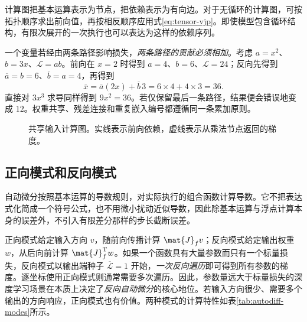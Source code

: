 \documentclass[../textbook.tex]{subfiles}
\begin{document}
计算图把基本运算表示为节点，把依赖表示为有向边。对于无循环的计算图，可按拓扑顺序求出前向值，再按相反顺序应用式\eqref{eq:tensor-vjp}。即使模型包含循环结构，有限次展开的一次执行也可以表达为这样的依赖序列。

一个变量若经由两条路径影响损失，\emph{两条路径的贡献必须相加}。考虑 $a=x^2$、$b=3x$、$\mathcal L=ab$。前向在 $x=2$ 时得到 $a=4$、$b=6$、$\mathcal L=24$；反向先得到 $\overline a=b=6$、$\overline b=a=4$，再得到
\begin{equation}
 \overline x=\overline a(2x)+\overline b\,3
 =6\times4+4\times3=36.
\end{equation}
直接对 $3x^3$ 求导同样得到 $9x^2=36$。若仅保留最后一条路径，结果便会错误地变成 $12$。权重共享、残差连接和重复嵌入编号都遵循同一条累加原则。

\begin{figure}[htbp]
\centering
{}
\caption[共享输入计算图]{共享输入计算图。实线表示前向依赖，虚线表示从乘法节点返回的梯度。}\label{fig:autodiff-shared-input}
\end{figure}

\subsection{正向模式和反向模式}
自动微分按照基本运算的导数规则，对实际执行的组合函数计算导数。它不把表达式化简成一个符号公式，也不用微小扰动近似导数，因此除基本运算与浮点计算本身的误差外，不引入有限差分那样的步长截断误差。

正向模式给定输入方向 $v$，随前向传播计算 $\mat{J}_fv$；反向模式给定输出权重 $w$，从后向前计算 $\mat{J}_f^{\mathrm{T}}w$。如果一个函数具有大量参数而只有一个标量损失，反向模式以输出端种子 $\overline{\mathcal L}=1$ 开始，\emph{一次反向遍历}即可得到所有参数的梯度。逐坐标使用正向模式则通常需要多次遍历。因此，参数量远大于标量损失的深度学习场景在本质上决定了\emph{反向自动微分}的核心地位。若输入方向很少、需要多个输出的方向响应，正向模式也有价值。两种模式的计算特性如表\ref{tab:autodiff-modes}所示。
\end{document}
